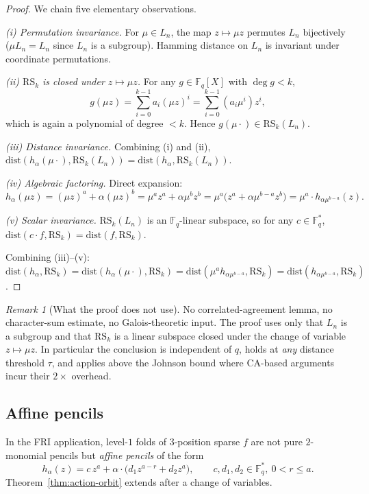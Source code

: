 \documentclass[11pt]{article}
\theoremstyle{definition}
\theoremstyle{remark}
\newtheorem{remark}[theorem]{Remark}
\newcommand{\FF}{\mathbb{F}}
\newcommand{\RS}{\mathrm{RS}}
\newcommand{\dist}{\mathrm{dist}}
\begin{document}
\begin{proof}
We chain five elementary observations.

\noindent\emph{(i) Permutation invariance.}
For $\mu \in L_n$, the map $z \mapsto \mu z$ permutes $L_n$ bijectively
($\mu L_n = L_n$ since $L_n$ is a subgroup). Hamming distance on $L_n$
is invariant under coordinate permutations.

\noindent\emph{(ii) $\RS_k$ is closed under $z \mapsto \mu z$.}
For any $g \in \FF_q[X]$ with $\deg g < k$,
\[
g(\mu z) = \sum_{i=0}^{k-1} a_i (\mu z)^i = \sum_{i=0}^{k-1} (a_i \mu^i) z^i,
\]
which is again a polynomial of degree $< k$. Hence $g(\mu \cdot) \in \RS_k(L_n)$.

\noindent\emph{(iii) Distance invariance.}
Combining (i) and (ii), $\dist(h_\alpha(\mu \cdot), \RS_k(L_n)) =
\dist(h_\alpha, \RS_k(L_n))$.

\noindent\emph{(iv) Algebraic factoring.}
Direct expansion:
\[
h_\alpha(\mu z) = (\mu z)^a + \alpha (\mu z)^b
 = \mu^a z^a + \alpha \mu^b z^b
 = \mu^a \bigl(z^a + \alpha \mu^{b-a} z^b\bigr)
 = \mu^a \cdot h_{\alpha \mu^{b-a}}(z).
\]

\noindent\emph{(v) Scalar invariance.}
$\RS_k(L_n)$ is an $\FF_q$-linear subspace, so for any $c \in \FF_q^*$,
$\dist(c \cdot f, \RS_k) = \dist(f, \RS_k)$.

\noindent Combining (iii)--(v):
$\dist(h_\alpha, \RS_k) = \dist(h_\alpha(\mu \cdot), \RS_k)
= \dist(\mu^a h_{\alpha \mu^{b-a}}, \RS_k)
= \dist(h_{\alpha \mu^{b-a}}, \RS_k)$.
\qedhere
\end{proof}

\begin{remark}[What the proof does not use]
\label{rem:no-CA}
No correlated-agreement lemma, no character-sum estimate, no Galois-theoretic
input. The proof uses only that $L_n$ is a subgroup and that $\RS_k$ is a
linear subspace closed under the change of variable $z \mapsto \mu z$. In
particular the conclusion is independent of $q$, holds at \emph{any} distance
threshold $\tau$, and applies above the Johnson bound where CA-based arguments
incur their $2{\times}$ overhead.
\end{remark}

\subsection{Affine pencils}

In the FRI application, level-$1$ folds of $3$-position sparse $f$ are not
pure $2$-monomial pencils but \emph{affine pencils} of the form
\[
h_\alpha(z) = c\, z^a + \alpha \cdot \bigl(d_1 z^{a-r} + d_2 z^a\bigr),
\qquad c, d_1, d_2 \in \FF_q^*,\ 0 < r \leq a.
\]
Theorem~\ref{thm:action-orbit} extends after a change of variables.
\end{document}
